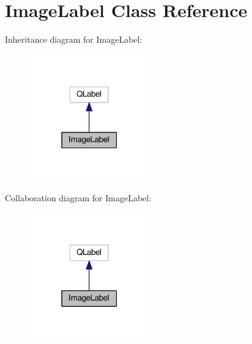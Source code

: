 \hypertarget{classImageLabel}{}\section{Image\+Label Class Reference}
\label{classImageLabel}


Inheritance diagram for Image\+Label\+:\nopagebreak
\begin{figure}[H]
\begin{center}
\leavevmode
\includegraphics[width=147pt]{classImageLabel__inherit__graph}
\end{center}
\end{figure}


Collaboration diagram for Image\+Label\+:\nopagebreak
\begin{figure}[H]
\begin{center}
\leavevmode
\includegraphics[width=147pt]{classImageLabel__coll__graph}
\end{center}
\end{figure}
